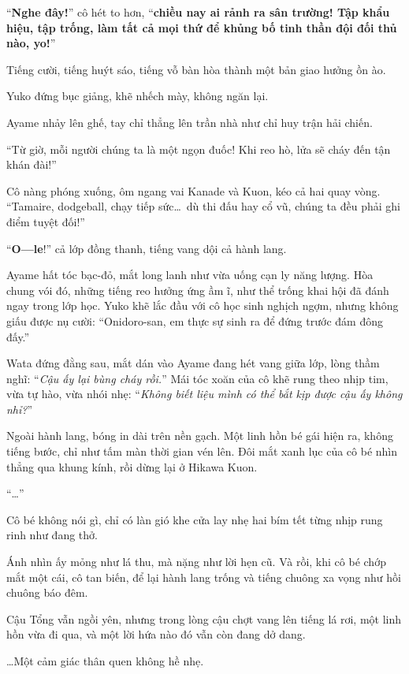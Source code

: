 \documentclass[../main.tex]{subfiles}
\begin{document}
``\textbf{Nghe đây!}'' cô hét to hơn, ``\textbf{chiều nay ai rảnh ra sân trường! Tập khẩu hiệu, tập trống, làm tất cả mọi thứ để khủng bố tinh thần đội đối thủ nào, yo!}''

Tiếng cười, tiếng huýt sáo, tiếng vỗ bàn hòa thành một bản giao hưởng ồn ào.

Yuko đứng bục giảng, khẽ nhếch mày, không ngăn lại.

Ayame nhảy lên ghế, tay chỉ thẳng lên trần nhà như chỉ huy trận hải chiến.

``Từ giờ, mỗi người chúng ta là một ngọn đuốc! Khi reo hò, lửa sẽ cháy đến tận khán đài!''

Cô nàng phóng xuống, ôm ngang vai Kanade và Kuon, kéo cả hai quay vòng. ``Tamaire, dodgeball, chạy tiếp sức\dots\ dù thi đấu hay cổ vũ, chúng ta đều phải ghi điểm tuyệt đối!''

``\textbf{O---le}!'' cả lớp đồng thanh, tiếng vang dội cả hành lang.

Ayame hất tóc bạc-đỏ, mắt long lanh như vừa uống cạn ly năng lượng. Hòa chung vói đó, những tiếng reo hưởng ứng ầm ĩ, như thể trống khai hội đã đánh ngay trong lớp học. Yuko khẽ lắc đầu với cô học sinh nghịch ngợm, nhưng không giấu được nụ cười: ``Onidoro-san, em thực sự sinh ra để đứng trước đám đông đấy.''

Wata đứng đằng sau, mắt dán vào Ayame đang hét vang giữa lớp, lòng thầm nghĩ: ``\textit{Cậu ấy lại bùng cháy rồi.}'' Mái tóc xoăn của cô khẽ rung theo nhịp tim, vừa tự hào, vừa nhói nhẹ: ``\textit{Không biết liệu mình có thể bắt kịp được cậu ấy không nhỉ?}''

\il

Ngoài hành lang, bóng in dài trên nền gạch. Một linh hồn bé gái hiện ra, không tiếng bước, chỉ như tấm màn thời gian vén lên. Đôi mắt xanh lục của cô bé nhìn thẳng qua khung kính, rồi dừng lại ở Hikawa Kuon.

``\dots''

Cô bé không nói gì, chỉ có làn gió khe cửa lay nhẹ hai bím tết từng nhịp rung rinh như đang thở.

Ánh nhìn ấy mỏng như lá thu, mà nặng như lời hẹn cũ. Và rồi, khi cô bé chớp mắt một cái, cô tan biến, để lại hành lang trống và tiếng chuông xa vọng như hồi chuông báo đêm.

Cậu Tổng vẫn ngồi yên, nhưng trong lòng cậu chợt vang lên tiếng lá rơi, một linh hồn vừa đi qua, và một lời hứa nào đó vẫn còn đang dở dang.

\dots Một cảm giác thân quen không hề nhẹ.
\end{document}
